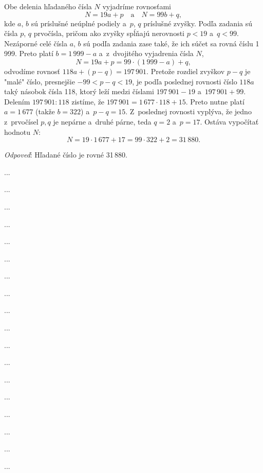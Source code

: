 {%
Obe delenia hľadaného
čísla $N$ vyjadríme rovnosťami
$$
N=19a+p\quad\text{a}\quad N=99b+q,
$$
kde $a$, $b$ sú príslušné neúplné podiely a~$p$, $q$
príslušné zvyšky.
Podľa zadania sú čísla $p$, $q$ prvočísla,
pričom ako zvyšky
spĺňajú nerovnosti $p<19$ a~$q<99$. Nezáporné celé
čísla $a$, $b$
sú podľa zadania zase také, že ich súčet sa rovná
číslu
1\,999. Preto platí $b=1\,999-a$ a~z~dvojitého vyjadrenia
čísla $N$,
$$
N=19a+p=99\cdot(1\,999-a)+q,
$$
odvodíme rovnosť $118a+(p-q)=197\,901$. Pretože rozdiel
zvyškov
$p-q$ je "malé" číslo, presnejšie ${-99}<p-q<19$, je podľa
poslednej rovnosti číslo $118a$ taký násobok
čísla 118, ktorý
leží medzi číslami $197\,901-19$ a~$197\,901+99$.
Delením $197\,901:118$
zistíme, že $197\,901=1\,677\cdot118+15$. Preto nutne
platí $a=1\,677$ (takže $b=322$) a~$p-q=15$. Z~poslednej
rovnosti vyplýva, že jedno
z~prvočísel $p,q$ je nepárne a~druhé párne, teda $q=2$ a~$p=17$.
Ostáva vypočítať hodnotu $N$:
$$
N=19\cdot1\,677+17=99\cdot322+2=31\,880.
$$

{\it Odpoveď\/}: Hľadané číslo je rovné 31\,880.
}

{%
...}

{%
...}

{%
...}

{%
...}

{%
...}

{%
...}

{%
...}

{%
...}

{%
...}

{%
...}

{%
...}

{%
...}

{%
...}

{%
...}

{%
...}

{%
...}

{%
...}

{%
...}

